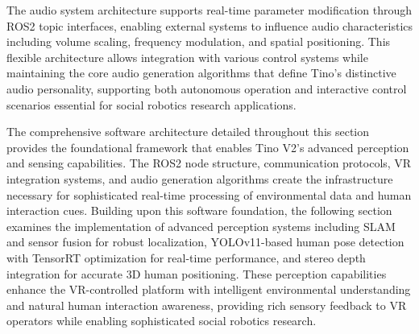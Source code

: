 The audio system architecture supports real-time parameter modification through ROS2 topic interfaces, enabling external systems to influence audio characteristics including volume scaling, frequency modulation, and spatial positioning. This flexible architecture allows integration with various control systems while maintaining the core audio generation algorithms that define Tino's distinctive audio personality, supporting both autonomous operation and interactive control scenarios essential for social robotics research applications.

The comprehensive software architecture detailed throughout this section provides the foundational framework that enables Tino V2's advanced perception and sensing capabilities. The ROS2 node structure, communication protocols, VR integration systems, and audio generation algorithms create the infrastructure necessary for sophisticated real-time processing of environmental data and human interaction cues. Building upon this software foundation, the following section examines the implementation of advanced perception systems including SLAM and sensor fusion for robust localization, YOLOv11-based human pose detection with TensorRT optimization for real-time performance, and stereo depth integration for accurate 3D human positioning. These perception capabilities enhance the VR-controlled platform with intelligent environmental understanding and natural human interaction awareness, providing rich sensory feedback to VR operators while enabling sophisticated social robotics research.

